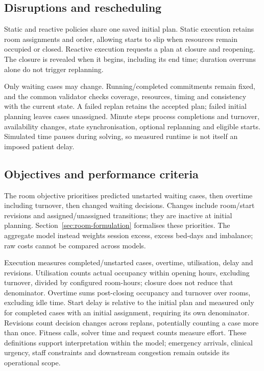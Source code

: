 \subsection{Disruptions and rescheduling}

Static and reactive policies share one saved initial plan. Static execution
retains room assignments and order, allowing starts to slip when resources
remain occupied or closed. Reactive execution requests a plan at closure and
reopening. The closure is revealed when it begins, including its end time;
duration overruns alone do not trigger replanning.

Only waiting cases may change. Running/completed commitments remain fixed,
and the common validator checks coverage, resources, timing and consistency
with the current state. A failed replan retains the accepted plan; failed
initial planning leaves cases unassigned. Minute steps process completions
and turnover, availability changes, state synchronisation, optional replanning
and eligible starts. Simulated time pauses during solving, so measured
runtime is not itself an imposed patient delay.

\subsection{Objectives and performance criteria}

The room objective prioritises predicted unstarted waiting cases, then
overtime including turnover, then changed waiting decisions. Changes include
room/start revisions and assigned/unassigned transitions; they are inactive
at initial planning. Section~\ref{sec:room-formulation} formalises these
priorities. The aggregate model instead weights session excess, excess
bed-days and imbalance; raw costs cannot be compared across models.

Execution measures completed/unstarted cases, overtime, utilisation, delay
and revisions. Utilisation counts actual occupancy within opening hours,
excluding turnover, divided by configured room-hours; closure does not reduce
that denominator. Overtime sums post-closing occupancy and turnover over
rooms, excluding idle time. Start delay is relative to the initial plan and
measured only for completed cases with an initial assignment, requiring its
own denominator. Revisions count decision changes across replans, potentially
counting a case more than once. Fitness calls, solver time and request counts
measure effort. These definitions support interpretation within the model;
emergency arrivals, clinical urgency, staff constraints and downstream
congestion remain outside its operational scope.
